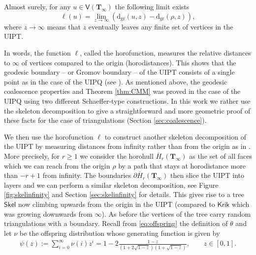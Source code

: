 \documentclass[AHL,XML,longabstracts,Unicode,NoSaveZebib]{cedram}
\begin{document}
\begin{theorem} \label{thm:CMM} Almost
  surely, for any %
  \mbox{$u \in \mathsf{V}(\mathbf{T}_{\infty})$} the following limit exists
$$ \ell(u) = \lim_{z \to \infty} \left( \mathrm{d_{gr}}(u, z) - \mathrm{d_{gr}}(\rho,z)\right),$$
where
 $z \to \infty$ means that $z$ eventually leaves any finite set of vertices in the UIPT.
\end{theorem}
In words, the function $\ell$, called the horofunction, measures the relative distances to $\infty$ of vertices compared to the origin (horodistances). This shows that the geodesic boundary -- or Gromov boundary -- of the UIPT consists of a single point as in the case of the UIPQ (see \cite[Section 2.5.1]{CMM10}). As mentioned above, the geodesic coalescence properties and Theorem \ref{thm:CMM}  was proved  \cite{CMM10}  in the case of the UIPQ using two different Schaeffer-type constructions. In this work we rather use the skeleton decomposition to give a straightforward and more geometric proof of these facts for the case of triangulations (Section \ref{sec:coalescence}).
\bigskip

We then use the horofunction $\ell$ to construct another skeleton decomposition of the UIPT by measuring distances from infinity rather than from the origin as in \cite{Kr}. More precisely,  for $r \geq 1$ we consider the horohull $ \overline{H}_{r}( \mathbf{T}_{\infty})$ as the set of all faces which we can reach from the origin $\rho$ by a path that stays at horodistance more than $-r+1$ from infinity. The boundaries $\partial \overline{H}_{r}( \mathbf{T}_{\infty})$ then slice the UIPT into layers and we can perform a similar skeleton decomposition, see Figure \ref{fig:skelinfinity} and Section \ref{sec:skelinfinity} for details. This gives rise to a tree $\mathsf{Skel}$ now climbing upwards from the origin in the UIPT (compared to $ \mathsf{Krik}$ which was growing downwards from $\infty$). As before the vertices of the tree carry random triangulations with a boundary. Recall from \eqref{eq:offspring} the definition of $\theta$ and let $\nu$ be the offspring distribution whose generating function is given by
 \begin{eqnarray} \label{def:nu}
 \psi(z) := \sum_{i=0}^{\infty} \nu(i) z^{i} = 1- 2 \frac{1-z}{(1+ 2 \sqrt{1-z})(1+ \sqrt{1-z})}, \qquad z \in [0,1].  \end{eqnarray}
\end{document}
